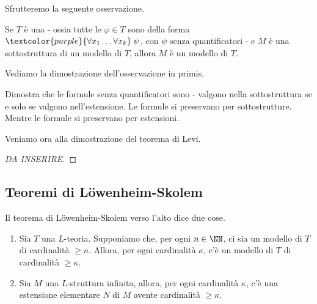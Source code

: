 Sfrutteremo la seguente osservazione.

\begin{remark}
    Se $T$ è una  - ossia tutte le $\varphi \in T$ sono della forma $\textcolor{purple}{\forall x_1 \ldots \forall x_k} \; \psi$,
    con $\psi$ senza quantificatori - e $M$ è una sottostruttura di un modello di $T$, allora $M$ è un modello di $T$.
\end{remark}

Vediamo la dimostrazione dell'osservazione in primis.

\begin{exercise}
    Dimostra che le formule senza quantificatori sono  - valgono nella sottostruttura se e solo se valgono nell'estensione. Le formule  si preservano
    per sottostrutture. Mentre le formule  si preservano per estensioni.
\end{exercise}

Veniamo ora alla dimostrazione del teorema di Levi.

\begin{proof}
    [DA INSERIRE]
\end{proof}

\subsection{Teoremi di Löwenheim-Skolem}

\begin{theorem}
    Il teorema di Löwenheim-Skolem verso l'alto dice due cose.
    \begin{enumerate}
        \item Sia $T$ una $L$-teoria. Supponiamo che, per ogni $n \in \NN$, ci sia un modello di $T$ di cardinalità $\geq n$. Allora, per ogni cardinalità $\kappa$, c'è un modello di $T$ di cardinalità $\geq \kappa$.
        \item Sia $M$ una $L$-struttura infinita, allora, per ogni cardinalità $\kappa$, c'è una estensione elementare $N$ di $M$ avente cardinalità $\geq \kappa$.
    \end{enumerate}
\end{theorem}

